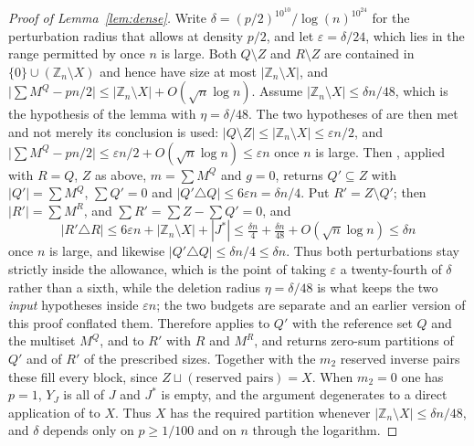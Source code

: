\documentclass[11pt,a4paper]{article}
\theoremstyle{plain}
\theoremstyle{definition}
\theoremstyle{remark}
\newcommand{\Z}{\mathbb{Z}}
\begin{document}
\begin{proof}[Proof of Lemma~\ref{lem:dense}]
Write $\delta=(p/2)^{10^{10}}/\log(n)^{10^{24}}$ for the perturbation radius
that \cite[Lemma~6.25]{MuyesserPokrovskiy2025} allows at density $p/2$, and
let $\varepsilon=\delta/24$, which lies in the range permitted by
\cite[Lemma~6.23]{MuyesserPokrovskiy2025} once $n$ is large.  Both
$Q\setminus Z$ and $R\setminus Z$ are contained in $\{0\}\cup(\Z_n\setminus X)$
and hence have size at most $|\Z_n\setminus X|$, and
$\bigl|\sum M^{Q}-pn/2\bigr|\le|\Z_n\setminus X|+O(\sqrt n\log n)$.  Assume
$|\Z_n\setminus X|\le\delta n/48$, which is the hypothesis of the lemma with
$\eta=\delta/48$.  The two hypotheses of
\cite[Lemma~6.23]{MuyesserPokrovskiy2025} are then met and not merely its
conclusion is used: $|Q\setminus Z|\le|\Z_n\setminus X|\le\varepsilon n/2$,
and $\bigl|\sum M^{Q}-pn/2\bigr|\le\varepsilon n/2+O(\sqrt n\log n)
\le\varepsilon n$ once $n$ is large.  Then
\cite[Lemma~6.23]{MuyesserPokrovskiy2025}, applied with
$R=Q$, $Z$ as above, $m=\sum M^{Q}$ and $g=0$, returns $Q'\subseteq Z$ with
$|Q'|=\sum M^{Q}$, $\sum Q'=0$ and
$|Q'\triangle Q|\le6\varepsilon n=\delta n/4$.  Put $R'=Z\setminus Q'$;
then $|R'|=\sum M^{R}$, and $\sum R'=\sum Z-\sum Q'=0$, and
$$|R'\triangle R|\le6\varepsilon n+|\Z_n\setminus X|+|J^{*}|
  \le\tfrac{\delta n}{4}+\tfrac{\delta n}{48}+O(\sqrt n\log n)\le\delta n$$
once $n$ is large, and likewise $|Q'\triangle Q|\le\delta n/4\le\delta n$.
Thus both perturbations stay strictly inside the allowance, which is the point
of taking $\varepsilon$ a twenty-fourth of $\delta$ rather than a sixth, while
the deletion radius $\eta=\delta/48$ is what keeps the two \emph{input}
hypotheses inside $\varepsilon n$; the two budgets are separate and an earlier
version of this proof conflated them.
Therefore \cite[Lemma~6.25]{MuyesserPokrovskiy2025} applies to $Q'$ with the
reference set $Q$ and the multiset $M^{Q}$, and to $R'$ with $R$ and $M^{R}$,
and returns zero-sum partitions of $Q'$ and of $R'$ of the prescribed sizes.  Together with
the $m_2$ reserved inverse pairs these fill every block, since
$Z\sqcup(\text{reserved pairs})=X$.  When $m_2=0$ one has
$p=1$, $Y_J$ is all of $J$ and $J^{*}$ is empty, and the argument degenerates
to a direct application of \cite[Lemma~6.25]{MuyesserPokrovskiy2025} to $X$.
Thus $X$ has the required partition
whenever $|\Z_n\setminus X|\le\delta n/48$, and $\delta$ depends only
on $p\ge1/100$ and on $n$ through the logarithm.
\end{proof}
\end{document}
